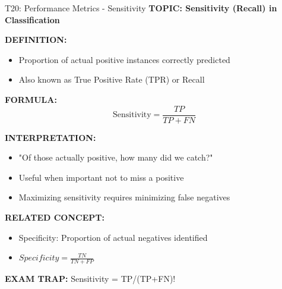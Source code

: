 \documentclass[8pt]{beamer}
\begin{document}
	\begin{frame}{T20: Performance Metrics - Sensitivity}
		\fontsize{6.5}{7.5}\selectfont
		\textbf{TOPIC: Sensitivity (Recall) in Classification}
		
		\vspace{0.1cm}
		\textbf{DEFINITION:}
		\begin{itemize}
			\item Proportion of actual positive instances correctly predicted
			\item Also known as True Positive Rate (TPR) or Recall
		\end{itemize}
		
		\vspace{0.1cm}
		\textbf{FORMULA:}
		\[
		\text{Sensitivity} = \frac{TP}{TP+FN}
		\]
		
		\vspace{0.1cm}
		\textbf{INTERPRETATION:}
		\begin{itemize}
			\item "Of those actually positive, how many did we catch?"
			\item Useful when important not to miss a positive
			\item Maximizing sensitivity requires minimizing false negatives
		\end{itemize}
		
		\vspace{0.1cm}
		\textbf{RELATED CONCEPT:}
		\begin{itemize}
			\item \textcolor{myblue}{Specificity:} Proportion of actual negatives identified
			\item $Specificity = \frac{TN}{TN+FP}$
		\end{itemize}
		
		\textcolor{myred}{\textbf{EXAM TRAP:}} Sensitivity = \textcolor{myblue}{TP/(TP+FN)}!
	\end{frame}
	
\end{document}
